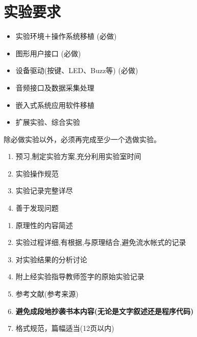 \chapter{实验要求}{}
\begin{itemize}
  \item 实验环境＋操作系统移植 ({\red 必做})
  \item 图形用户接口 ({\red 必做})
  \item 设备驱动(按键、LED、Buzz等) ({\red 必做})
  \item 音频接口及数据采集处理
  \item 嵌入式系统应用软件移植
  \item 扩展实验、综合实验
\end{itemize}
除必做实验以外，必须再完成至少一个选做实验。
\endslide

\begin{enumerate}
  \item 预习,制定实验方案,充分利用实验室时间
  \item 实验操作规范
  \item 实验记录完整详尽
  \item 善于发现问题
\end{enumerate}
\endslide

\begin{enumerate}
  \item 原理性的内容简述
  \item 实验过程详细,有根据,与原理结合,避免流水帐式的记录
  \item 对实验结果的分析讨论
  \item 附上经实验指导教师签字的原始实验记录
  \item 参考文献(参考来源)
  \item {\bf 避免成段地抄袭书本内容(无论是文字叙述还是程序代码)}
  \item 格式规范，篇幅适当(12页以内)
\end{enumerate}
\endslide
